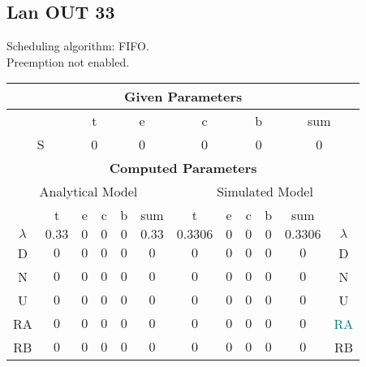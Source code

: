 \documentclass{article}
\begin{document}
\subsection{Lan OUT 33}
Scheduling algorithm: FIFO.\\Preemption not enabled. \\\begin{table}[H]\centering\begin{tabular}{@{}c|cccc|c||cccc|c|c@{}}\toprule\multicolumn{12}{c}{\textbf{Given Parameters}}\\\midrule\multicolumn{2}{c|}{ } & \multicolumn{2}{c}{t} & \multicolumn{2}{c}{e} & \multicolumn{2}{c}{c} & \multicolumn{2}{c}{b} & \multicolumn{2}{|c}{sum} \\ \midrule\multicolumn{2}{c|}{S} & \multicolumn{2}{c}{0} & \multicolumn{2}{c}{0} & \multicolumn{2}{c}{0} & \multicolumn{2}{c}{0} & \multicolumn{2}{|c}{0}\\ \midrule\midrule\multicolumn{12}{c}{\textbf{Computed Parameters}}\\ \midrule\multicolumn{6}{c||}{Analytical Model} & \multicolumn{6}{c}{Simulated Model}\\ 
 \midrule & t & e & c & b & sum & t & e & c & b & sum &  \\ \midrule$\lambda$ &$0.33$ & $0$ & $0$ & $0$ & $0.33$ & $0.3306$ & $0$ & $0$ & $0$ & $0.3306$& $\lambda$ \\D & $0$ & $0$ & $0$ & $0$ & $0$ & $0$ & $0$ & $0$ & $0$ & $0$& D\\N & $0$ & $0$ & $0$ & $0$ & $0$ & $0$ & $0$ & $0$ & $0$ & $0$& N\\U & $0$ & $0$ & $0$ & $0$ & $0$ & $0$ & $0$ & $0$ & $0$ & $0$& U\\RA & $0$ & $0$ & $0$ & $0$ & $0$ & $0$ & $0$ & $0$ & $0$ & $0$& \textcolor{teal}{RA}\\RB & $0$ & $0$ & $0$ & $0$ & $0$ & $0$ & $0$ & $0$ & $0$ & $0$& RB\\
\bottomrule
\end{tabular}
\end{table}
\filbreak
\end{document}
